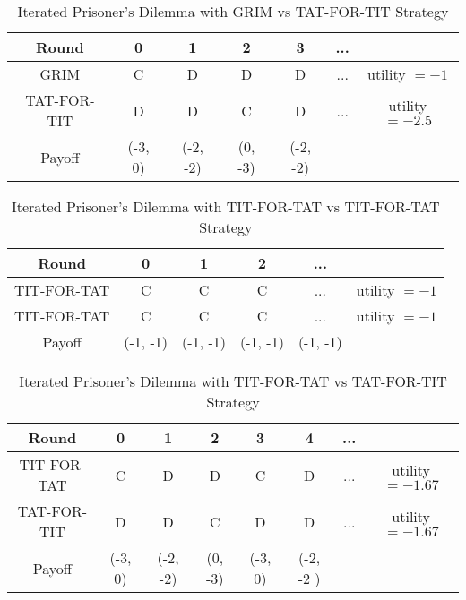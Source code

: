 \documentclass[a4paper]{article}
\begin{document}
\begin{exercise}{5}
\begin{enumerate}[label=(\alph*)]
\begin{table}[H]
\begin{tabular}{c c c c c c c}
          \hline
          Round & 0 & 1 & 2 & 3 & ... & \\
          \hline
          GRIM          & C        & D        & D        & D        & ... & utility $ =-1 $\\
          TAT-FOR-TIT   & D        & D        & C        & D        & ... & utility $ =-2.5 $\\
          Payoff        & (-3, 0) & (-2, -2) & (0, -3)   & (-2, -2) & \\
          \hline
        \end{tabular}
        \caption{Iterated Prisoner's Dilemma with GRIM vs TAT-FOR-TIT Strategy}
      \end{table}
      \begin{table}[H]
        \centering
        \begin{tabular}{c c c c c c }
          \hline
          Round & 0 & 1 & 2 & ... & \\
          \hline
          TIT-FOR-TAT   & C        & C        & C        & ... & utility $ =-1 $\\
          TIT-FOR-TAT   & C        & C        & C        & ... & utility $ =-1 $\\
          Payoff        & (-1, -1) & (-1, -1) & (-1, -1) & (-1, -1) & \\
          \hline
        \end{tabular}
        \caption{Iterated Prisoner's Dilemma with TIT-FOR-TAT vs TIT-FOR-TAT Strategy}
      \end{table}
      \begin{table}[H]
        \centering
        \begin{tabular}{c c c c c c c c}
          \hline
          Round & 0 & 1 & 2 & 3 & 4 & ... & \\
          \hline
          TIT-FOR-TAT   & C        & D        & D        & C         & D & ... & utility $ =-1.67 $\\
          TAT-FOR-TIT   & D        & D        & C        & D         & D & ... & utility $ =-1.67 $\\
          Payoff        & (-3, 0)  & (-2, -2) & (0, -3) & (-3, 0)    & (-2, -2 )\\
          \hline
        \end{tabular}
        \caption{Iterated Prisoner's Dilemma with TIT-FOR-TAT vs TAT-FOR-TIT Strategy}
      \end{table}
      \begin{table}[H]
        \centering
        \begin{tabular}{c c c c c c }

\end{tabular}
\end{table}
\end{enumerate}
\end{exercise}
\end{document}

